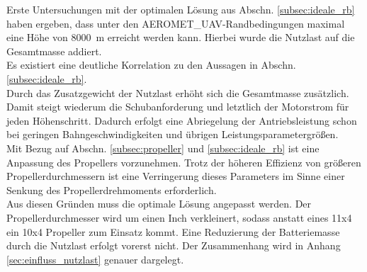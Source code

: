 Erste Untersuchungen mit der optimalen Lösung aus Abschn. \ref{subsec:ideale_rb} haben ergeben, dass unter den AEROMET\_UAV-Randbedingungen maximal eine Höhe von \SI{8000}{m} erreicht werden kann. Hierbei wurde die Nutzlast auf die Gesamtmasse addiert. \\
Es existiert eine deutliche Korrelation zu den Aussagen in Abschn. \ref{subsec:ideale_rb}.\\
Durch das Zusatzgewicht der Nutzlast erhöht sich die Gesamtmasse zusätzlich. Damit steigt wiederum die Schubanforderung und letztlich der Motorstrom für jeden Höhenschritt. Dadurch erfolgt eine Abriegelung der Antriebsleistung schon bei geringen Bahngeschwindigkeiten und übrigen Leistungsparametergrößen. \\
Mit Bezug auf Abschn. \ref{subsec:propeller} und \ref{subsec:ideale_rb} ist eine Anpassung des Propellers vorzunehmen. Trotz der höheren Effizienz von größeren Propellerdurchmessern ist eine Verringerung dieses Parameters im Sinne einer Senkung des Propellerdrehmoments erforderlich. \\
Aus diesen Gründen muss die optimale Lösung angepasst werden. Der Propellerdurchmesser wird um einen Inch verkleinert, sodass anstatt eines 11x4 ein 10x4 Propeller zum Einsatz kommt. Eine Reduzierung der Batteriemasse durch die Nutzlast erfolgt vorerst nicht. Der Zusammenhang wird in Anhang \ref{sec:einfluss_nutzlast} genauer dargelegt.

